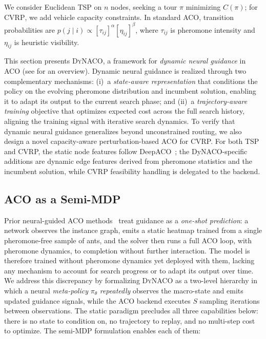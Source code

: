 \documentclass[sigconf]{acmart}
\newcommand{\TSP}{\textsc{TSP}}
\newcommand{\CVRP}{\textsc{CVRP}}
\newcommand{\DyNACO}{\textsc{DyNACO}}
\newcommand{\MMAS}{\textsc{MMAS}}
\begin{document}
We consider Euclidean \TSP{} on $n$ nodes, seeking a tour $\pi$ minimizing $C(\pi)$; for \CVRP{}, we add vehicle capacity constraints.
In standard ACO, transition probabilities are $p(j \mid i) \propto [\tau_{ij}]^\alpha [\eta_{ij}]^\beta$, where $\tau_{ij}$ is pheromone intensity and $\eta_{ij}$ is heuristic visibility.

This section presents \DyNACO{}, a framework for \emph{dynamic neural guidance} in ACO (see  for an overview).
Dynamic neural guidance is realized through two complementary mechanisms: (i)~a \emph{state-aware representation} that conditions the policy on the evolving pheromone distribution and incumbent solution, enabling it to adapt its output to the current search phase; and (ii)~a \emph{trajectory-aware training} objective that optimizes expected cost across the full search history, aligning the training signal with iterative search dynamics.
To verify that dynamic neural guidance generalizes beyond unconstrained routing, we also design a novel capacity-aware perturbation-based ACO for CVRP. For both TSP and CVRP, the static node features follow DeepACO~\cite{deepaco}; the DyNACO-specific additions are dynamic edge features derived from pheromone statistics and the incumbent solution, while CVRP feasibility handling is delegated to the backend.

\subsection{ACO as a Semi-MDP}
\label{sec:mdp}

Prior neural-guided ACO methods~\cite{deepaco,gfacs,gtgaco} treat guidance as a \emph{one-shot prediction}: a network observes the instance graph, emits a static heatmap trained from a single pheromone-free sample of ants, and the solver then runs a full ACO loop, with pheromone dynamics, to completion without further interaction.
The model is therefore trained without pheromone dynamics yet deployed with them, lacking any mechanism to account for search progress or to adapt its output over time.
We address this discrepancy by formalizing \DyNACO{} as a two-level hierarchy in which a neural \emph{meta-policy} $\pi_\theta$ \emph{repeatedly} observes the macro-state and emits updated guidance signals, while the ACO backend executes $S$ sampling iterations between observations.
The static paradigm precludes all three capabilities below: there is no state to condition on, no trajectory to replay, and no multi-step cost to optimize.  The semi-MDP formulation enables each of them:
\end{document}
